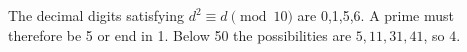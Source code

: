 The decimal digits satisfying $d^2\equiv d\pmod{10}$ are 0,1,5,6. A prime must therefore be 5 or end in 1. Below 50 the possibilities are $5,11,31,41$, so $\boxed4$.
